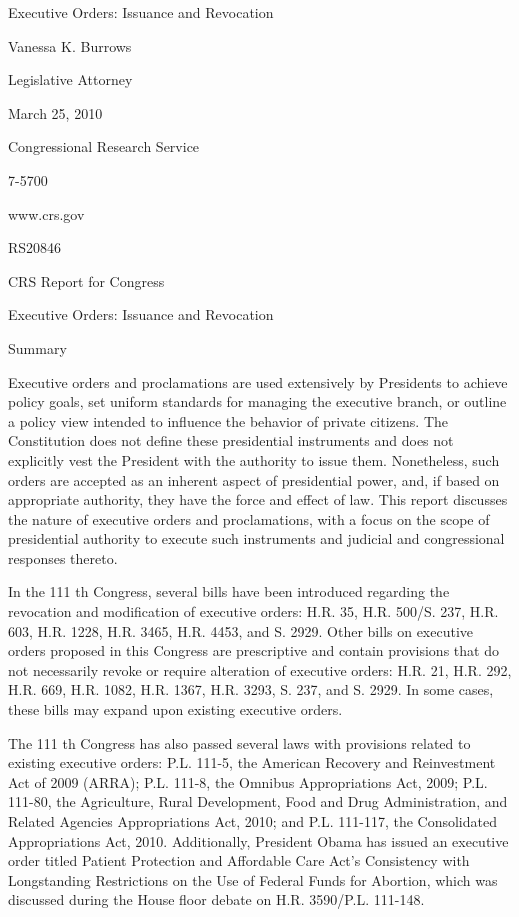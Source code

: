 \documentclass[11pt,a4paper]{article}
\begin{document}
Executive Orders: Issuance and Revocation

Vanessa K. Burrows

Legislative Attorney

March 25, 2010

Congressional Research Service

7-5700

www.crs.gov

RS20846

CRS Report for Congress

Executive Orders: Issuance and Revocation

Summary

Executive orders and proclamations are used extensively by Presidents to achieve policy goals, set uniform standards for managing the executive branch, or outline a policy view intended to influence the behavior of private citizens. The Constitution does not define these presidential instruments and does not explicitly vest the President with the authority to issue them. Nonetheless, such orders are accepted as an inherent aspect of presidential power, and, if based on appropriate authority, they have the force and effect of law. This report discusses the nature of executive orders and proclamations, with a focus on the scope of presidential authority to execute such instruments and judicial and congressional responses thereto.

In the 111 th Congress, several bills have been introduced regarding the revocation and modification of executive orders: H.R. 35, H.R. 500/S. 237, H.R. 603, H.R. 1228, H.R. 3465, H.R. 4453, and S. 2929. Other bills on executive orders proposed in this Congress are prescriptive and contain provisions that do not necessarily revoke or require alteration of executive orders: H.R. 21, H.R. 292, H.R. 669, H.R. 1082, H.R. 1367, H.R. 3293, S. 237, and S. 2929. In some cases, these bills may expand upon existing executive orders.

The 111 th Congress has also passed several laws with provisions related to existing executive orders: P.L. 111-5, the American Recovery and Reinvestment Act of 2009 (ARRA); P.L. 111-8, the Omnibus Appropriations Act, 2009; P.L. 111-80, the Agriculture, Rural Development, Food and Drug Administration, and Related Agencies Appropriations Act, 2010; and P.L. 111-117, the Consolidated Appropriations Act, 2010. Additionally, President Obama has issued an executive order titled Patient Protection and Affordable Care Act's Consistency with Longstanding Restrictions on the Use of Federal Funds for Abortion, which was discussed during the House floor debate on H.R. 3590/P.L. 111-148.
\end{document}
